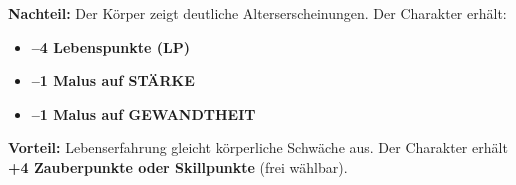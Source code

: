 \begin{traitbox}{}
	
	\textbf{Nachteil:}  
	Der Körper zeigt deutliche Alterserscheinungen.
	Der Charakter erhält:
	\begin{itemize}
		\item \textbf{–4 Lebenspunkte (LP)}
		\item \textbf{–1 Malus auf STÄRKE}
		\item \textbf{–1 Malus auf GEWANDTHEIT}
	\end{itemize}
	
	\medskip
	\textbf{Vorteil:}  
	Lebenserfahrung gleicht körperliche Schwäche aus.
	Der Charakter erhält \textbf{+4 Zauberpunkte oder Skillpunkte}
	(frei wählbar).
	
\end{traitbox}

